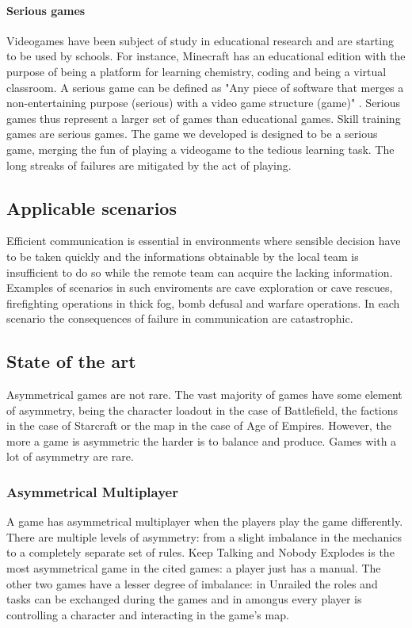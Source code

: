 \documentclass[12pt]{article}
\begin{document}
\paragraph{Serious games}
Videogames have been subject of study in educational research and are starting to be used by schools. For instance, Minecraft \cite{minecraft} has an educational edition with the purpose of being a platform for learning chemistry, coding and being a virtual classroom. A serious game can be defined as "Any piece of software that merges a non-entertaining purpose (serious) with a video game structure (game)" \cite{serious}. Serious games thus represent a larger set of games than educational games. Skill training games are serious games. The game we developed is designed to be a serious game, merging the fun of playing a videogame to the tedious learning task. The long streaks of failures are mitigated by the act of playing.

\subsection{Applicable scenarios}
Efficient communication is essential in environments where sensible decision have to be taken quickly and the informations obtainable by the local team is insufficient to do so while the remote team can acquire the lacking information. Examples of scenarios in such enviroments are cave exploration or cave rescues, firefighting operations in thick fog, bomb defusal and warfare operations. In each scenario the consequences of failure in communication are catastrophic.

\clearpage

\subsection{State of the art}
Asymmetrical games are not rare. The vast majority of games have some element of asymmetry, being the character loadout in the case of Battlefield, the factions in the case of Starcraft or the map in the case of Age of Empires. However, the more a game is asymmetric the harder is to balance and produce. Games with a lot of asymmetry are rare. 

\subsubsection{Asymmetrical Multiplayer}
A game has asymmetrical multiplayer when the players play the game differently. There are multiple levels of asymmetry: from a slight imbalance in the mechanics to a completely separate set of rules. Keep Talking and Nobody Explodes is the most asymmetrical game in the cited games: a player just has a manual. The other two games have a lesser degree of imbalance: in Unrailed the roles and tasks can be exchanged during the games and in amongus every player is controlling a character and interacting in the game's map.
\end{document}
